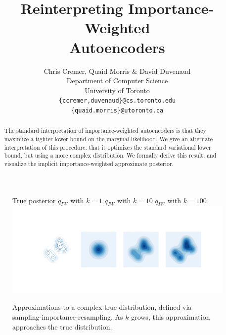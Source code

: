 \documentclass{article} %
\title{Reinterpreting Importance-Weighted \\Autoencoders}
\author{Chris Cremer, Quaid Morris \& David Duvenaud \\
Department of Computer Science\\
University of Toronto\\
\texttt{\{ccremer,duvenaud\}@cs.toronto.edu} \\
\texttt{\{quaid.morris\}@utoronto.ca}
}
\begin{document}
\maketitle

\begin{abstract}
The standard interpretation of importance-weighted autoencoders is that they maximize a tighter lower bound on the marginal likelihood.
We give an alternate interpretation of this procedure: that it optimizes the standard variational lower bound, but using a more complex distribution. 
We formally derive this result, and visualize the implicit importance-weighted approximate posterior.
\end{abstract}
 

\begin{figure}[b]
  \centering
  \quad True posterior \quad  \qquad $q_{IW}$ with $k=1$  \quad \qquad $q_{IW}$ with $k=10$  \qquad $q_{IW}$ with $k=100$
      \includegraphics[width=1.\textwidth, clip, trim=2.5cm 3.9cm 2cm 3.6cm]{figs/figure_1.png}
  \vspace{-5mm}
  \caption{Approximations to a complex true distribution, defined via sampling-importance-resampling. As $k$ grows, this approximation approaches the true distribution.}
  \label{viz1}
\end{figure}
\end{document}
